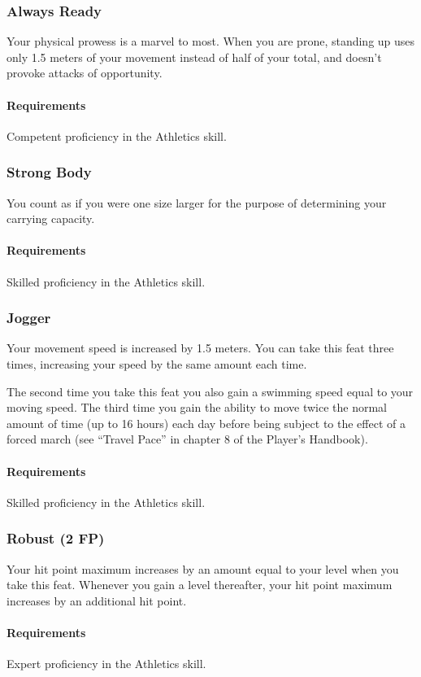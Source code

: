 \subsubsection{Always Ready} \label{feat::alwaysready}
    Your physical prowess is a marvel to most.
    When you are prone, standing up uses only 1.5 meters of your movement instead of half of your total, and doesn't provoke attacks of opportunity.
    \paragraph{Requirements} Competent proficiency in the Athletics skill.
\subsubsection{Strong Body} \label{feat::strongbody}
    You count as if you were one size larger for the purpose of determining your carrying capacity.
    \paragraph{Requirements} Skilled proficiency in the Athletics skill.
\subsubsection{Jogger} \label{feat::jogger}
    Your movement speed is increased by 1.5 meters.
    You can take this feat three times, increasing your speed by the same amount each time.

    The second time you take this feat you also gain a swimming speed equal to your moving speed.
    The third time you gain the ability to move twice the normal amount of time (up to 16 hours) each day before being subject to the effect of a forced march (see ``Travel Pace'' in chapter 8 of the Player's Handbook).
    \paragraph{Requirements} Skilled proficiency in the Athletics skill.
\subsubsection{Robust (2 FP)} \label{feat::robust}
    Your hit point maximum increases by an amount equal to your level when you take this feat.
    Whenever you gain a level thereafter, your hit point maximum increases by an additional hit point.
    \paragraph{Requirements} Expert proficiency in the Athletics skill.
